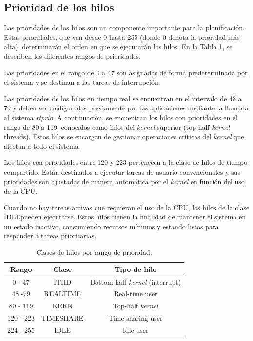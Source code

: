 \subsection{Prioridad de los hilos}

Las prioridades de los hilos son un componente importante para la planificación. Estas prioridades, que van desde 0 hasta 255 (donde 0 denota la prioridad más alta), determinarán el orden en que se ejecutarán los hilos. En la Tabla \ref{tabla:prio-hilos}, se describen los diferentes rangos de prioridades.

Las prioridades en el rango de 0 a 47 son asignadas de forma predeterminada por el sistema y se destinan a las tareas de interrupción.\par

Las prioridades de los hilos en tiempo real se encuentran en el intervalo de 48 a 79 y deben ser configuradas previamente por las aplicaciones mediante la llamada al sistema \textit{rtprio}. A continuación, se encuentran los hilos con prioridades en el rango de 80 a 119, conocidos como hilos del \textit{kernel} superior (top-half \textit{kernel} threads). Estos hilos se encargan de gestionar operaciones críticas del \textit{kernel} que afectan a todo el sistema.\par

Los hilos con prioridades entre 120 y 223 pertenecen a la clase de hilos de tiempo compartido. Están destinados a ejecutar tareas de usuario convencionales y sus prioridades son ajustadas de manera automática por el \textit{kernel} en función del uso de la CPU.\par

Cuando no hay tareas activas que requieran el uso de la CPU, los hilos de la clase \"IDLE\" pueden ejecutarse. Estos hilos tienen la finalidad de mantener el sistema en un estado inactivo, consumiendo recursos mínimos y estando listos para responder a tareas prioritarias.\par

\begin{table}[H]
    \centering
    \begin{tabular}{|c|c|c|}
        \hline
        \textbf{Rango} & \textbf{Clase} & \textbf{Tipo de hilo}          \\
        \hline
        0 - 47         & ITHD           & Bottom-half \textit{kernel} (interrupt) \\
        \hline
        48 -79         & REALTIME       & Real-time user                 \\
        \hline
        80 - 119       & KERN           & Top-half \textit{kernel}                \\
        \hline
        120 - 223      & TIMESHARE      & Time-sharing user              \\
        \hline
        224 - 255      & IDLE           & Idle user                      \\
        \hline
    \end{tabular}
    \caption{Clases de hilos por rango de prioridad.}
    \label{tabla:prio-hilos}
\end{table}


